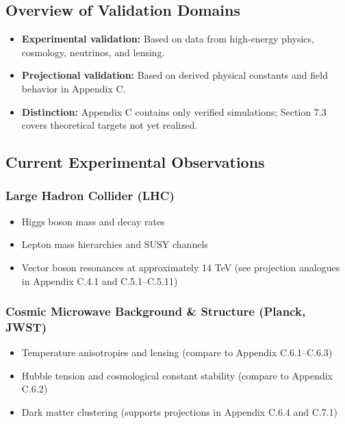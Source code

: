 \documentclass[10.5pt,a4paper]{article}
\begin{document}
\subsection{Overview of Validation Domains}

\begin{itemize}
  \item \textbf{Experimental validation:} Based on data from high-energy physics, cosmology, neutrinos, and lensing.
  \item \textbf{Projectional validation:} Based on derived physical constants and field behavior in Appendix C.
  \item \textbf{Distinction:} Appendix C contains only verified simulations; Section 7.3 covers theoretical targets not yet realized.
\end{itemize}

\subsection{Current Experimental Observations}

\subsubsection{Large Hadron Collider (LHC)}

\begin{itemize}
  \item Higgs boson mass and decay rates
  \item Lepton mass hierarchies and SUSY channels
  \item Vector boson resonances at approximately 14 TeV (see projection analogues in Appendix C.4.1 and C.5.1--C.5.11)
\end{itemize}

\subsubsection{Cosmic Microwave Background \& Structure (Planck, JWST)}

\begin{itemize}
  \item Temperature anisotropies and lensing (compare to Appendix C.6.1--C.6.3)
  \item Hubble tension and cosmological constant stability (compare to Appendix C.6.2)
  \item Dark matter clustering (supports projections in Appendix C.6.4 and C.7.1)
\end{itemize}
\end{document}
